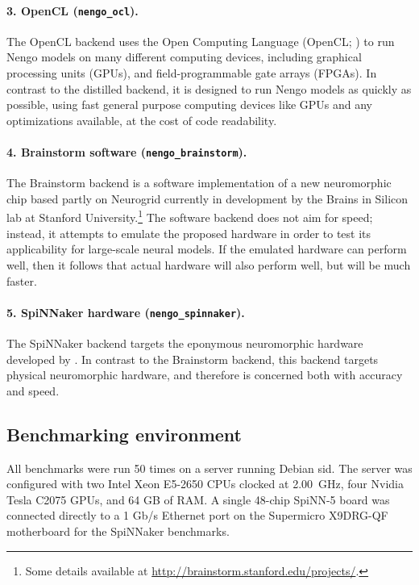 \documentclass{frontiersSCNS}
\begin{document}
\paragraph{3. OpenCL (\texttt{nengo\_ocl}).}
The OpenCL backend uses the Open Computing Language
(OpenCL; \citealp{stone2010})
to run Nengo models on many different computing devices,
including graphical processing units (GPUs),
and field-programmable gate arrays (FPGAs).
In contrast to the distilled backend,
it is designed to run Nengo models
as quickly as possible,
using fast general purpose computing devices
like GPUs and any optimizations available,
at the cost of code readability.

\paragraph{4. Brainstorm software (\texttt{nengo\_brainstorm}).}
The Brainstorm backend is a software implementation
of a new neuromorphic chip
based partly on Neurogrid \citep{benjamin2014}
currently in development
by the Brains in Silicon lab
at Stanford University.\footnote{
  Some details available at \url{http://brainstorm.stanford.edu/projects/}.}
The software backend does not aim for speed;
instead, it attempts to emulate the proposed hardware
in order to test its applicability
for large-scale neural models.
If the emulated hardware can perform well,
then it follows that actual hardware
will also perform well,
but will be much faster.

\paragraph{5. SpiNNaker hardware (\texttt{nengo\_spinnaker}).}
The SpiNNaker backend \citep{mundy2015}
targets the eponymous neuromorphic hardware
developed by \citet{furber2014}.
In contrast to the Brainstorm backend,
this backend targets physical neuromorphic hardware,
and therefore is concerned
both with accuracy and speed.

\subsection{Benchmarking environment}

All benchmarks were run 50 times
on a server running Debian sid.
The server was configured with
two Intel Xeon E5-2650 CPUs
clocked at 2.00~GHz,
four Nvidia Tesla C2075 GPUs,
and 64 GB of RAM.
A single 48-chip SpiNN-5 board
was connected directly to
a 1 Gb/s Ethernet port on
the Supermicro X9DRG-QF motherboard
for the SpiNNaker benchmarks.
\end{document}
